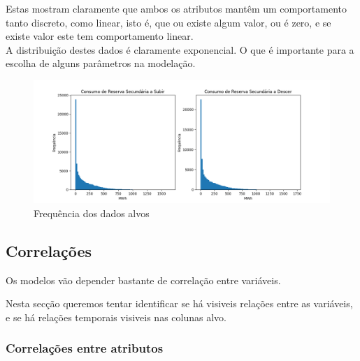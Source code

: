 Estas mostram claramente que ambos os atributos mantêm um comportamento tanto discreto, como linear, isto é, que ou existe algum valor, ou é zero, e se existe valor este tem comportamento linear.\\
A distribuição destes dados é claramente exponencial. O que é importante para a escolha de alguns parâmetros na modelação. \\

		
\begin{figure}[H]
  \centering
  \includegraphics[width=\textwidth]{plots/target_histograms.png}
  \caption{Frequência dos dados alvos}
  \label{fig:targethistograms}
\end{figure}


\subsection{Correlações}

Os modelos vão depender bastante de correlação entre variáveis.

Nesta secção queremos tentar identificar se há visiveis relações entre as variáveis, e se há relações temporais  visiveis nas colunas alvo.


\subsubsection{Correlações entre atributos}


